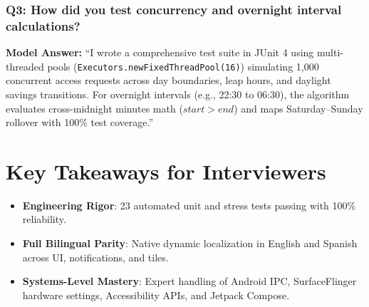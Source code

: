 \documentclass[11pt,a4paper]{article}
\begin{document}
\subsubsection*{Q3: How did you test concurrency and overnight interval calculations?}
\textbf{Model Answer:} ``I wrote a comprehensive test suite in JUnit 4 using multi-threaded pools (\texttt{Executors.newFixedThreadPool(16)}) simulating 1,000 concurrent access requests across day boundaries, leap hours, and daylight savings transitions. For overnight intervals (e.g., 22:30 to 06:30), the algorithm evaluates cross-midnight minutes math ($start > end$) and maps Saturday--Sunday rollover with 100\% test coverage.''

\section{Key Takeaways for Interviewers}
\begin{itemize}[noitemsep]
    \item \textbf{Engineering Rigor}: 23 automated unit and stress tests passing with 100\% reliability.
    \item \textbf{Full Bilingual Parity}: Native dynamic localization in English and Spanish across UI, notifications, and tiles.
    \item \textbf{Systems-Level Mastery}: Expert handling of Android IPC, SurfaceFlinger hardware settings, Accessibility APIs, and Jetpack Compose.
\end{itemize}
\end{document}
